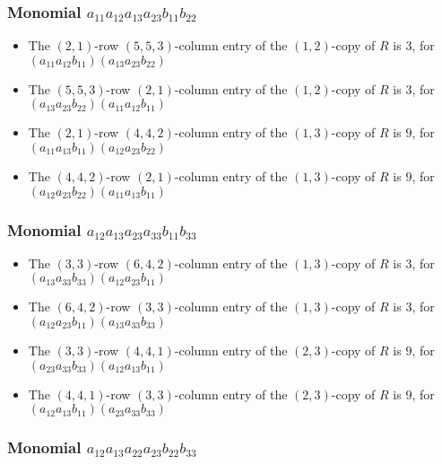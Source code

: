 \documentclass{article}
\begin{document}
\subsubsection{Monomial $ a_{11} a_{12} a_{13} a_{23} b_{11} b_{22} $}

\begin{itemize}
\item The $(2, 1)$-row $(5, 5, 3)$-column entry of the $ \left(1, 2\right) $-copy of $R$ is $ 3 $, for $( a_{11} a_{12} b_{11} )( a_{13} a_{23} b_{22} )$ 
\item The $(5, 5, 3)$-row $(2, 1)$-column entry of the $ \left(1, 2\right) $-copy of $R$ is $ 3 $, for $( a_{13} a_{23} b_{22} )( a_{11} a_{12} b_{11} )$ 
\item The $(2, 1)$-row $(4, 4, 2)$-column entry of the $ \left(1, 3\right) $-copy of $R$ is $ 9 $, for $( a_{11} a_{13} b_{11} )( a_{12} a_{23} b_{22} )$ 
\item The $(4, 4, 2)$-row $(2, 1)$-column entry of the $ \left(1, 3\right) $-copy of $R$ is $ 9 $, for $( a_{12} a_{23} b_{22} )( a_{11} a_{13} b_{11} )$ 
\end{itemize}
\subsubsection{Monomial $ a_{12} a_{13} a_{23} a_{33} b_{11} b_{33} $}

\begin{itemize}
\item The $(3, 3)$-row $(6, 4, 2)$-column entry of the $ \left(1, 3\right) $-copy of $R$ is $ 3 $, for $( a_{13} a_{33} b_{33} )( a_{12} a_{23} b_{11} )$ 
\item The $(6, 4, 2)$-row $(3, 3)$-column entry of the $ \left(1, 3\right) $-copy of $R$ is $ 3 $, for $( a_{12} a_{23} b_{11} )( a_{13} a_{33} b_{33} )$ 
\item The $(3, 3)$-row $(4, 4, 1)$-column entry of the $ \left(2, 3\right) $-copy of $R$ is $ 9 $, for $( a_{23} a_{33} b_{33} )( a_{12} a_{13} b_{11} )$ 
\item The $(4, 4, 1)$-row $(3, 3)$-column entry of the $ \left(2, 3\right) $-copy of $R$ is $ 9 $, for $( a_{12} a_{13} b_{11} )( a_{23} a_{33} b_{33} )$ 
\end{itemize}
\subsubsection{Monomial $ a_{12} a_{13} a_{22} a_{23} b_{22} b_{33} $}
\end{document}
